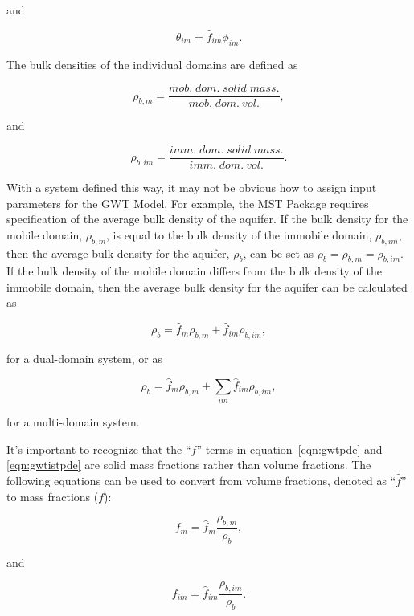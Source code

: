 \noindent and

\begin{equation}
\label{eqn:theta2}
\theta_{im} = \hat{f}_{im} \phi_{im}.
\end{equation}


The bulk densities of the individual domains are defined as

\begin{equation}
\label{eqn:rhob_m}
\rho_{b,m} = \frac{mob. \; dom. \; solid \; mass.}{mob. \; dom. \: vol.},
\end{equation}
 
 \noindent and
 
\begin{equation}
\label{eqn:rhob_im}
\rho_{b,im} = \frac{imm. \; dom. \; solid \; mass.}{imm. \; dom. \: vol.}.
\end{equation}
 
 With a system defined this way, it may not be obvious how to assign input parameters for the GWT Model.  For example, the MST Package requires specification of the average bulk density of the aquifer.  If the bulk density for the mobile domain, $\rho_{b,m}$, is equal to the bulk density of the immobile domain, $\rho_{b,im}$, then the average bulk density for the aquifer, $\rho_{b}$, can be set as $\rho_{b} = \rho_{b,m} = \rho_{b,im}$.  If the bulk density of the mobile domain differs from the bulk density of the immobile domain, then the average bulk density for the aquifer can be calculated as
 
\begin{equation}
\label{eqn:rhob1}
\rho_{b} = \hat{f}_m \rho_{b, m} + \hat{f}_{im} \rho_{b, im},
\end{equation}

\noindent for a dual-domain system, or as

\begin{equation}
\label{eqn:rhob2}
\rho_{b} = \hat{f}_m \rho_{b, m} + \sum_{im}{\hat{f}_{im} \rho_{b, im}},
\end{equation}

\noindent for a multi-domain system.

It's important to recognize that the ``$f$'' terms in equation~\ref{eqn:gwtpde} and \ref{eqn:gwtistpde} are solid mass fractions rather than volume fractions.  The following equations can be used to convert from volume fractions, denoted as ``$\hat{f}$'' to mass fractions ($f$):

\begin{equation}
\label{eqn:fmfm}
f_{m} = \hat{f}_m \frac{\rho_{b, m}}{\rho_{b}},
\end{equation}

\noindent and 

\begin{equation}
\label{eqn:fmfm}
f_{im} = \hat{f}_{im} \frac{\rho_{b, im}}{\rho_{b}}.
\end{equation}
